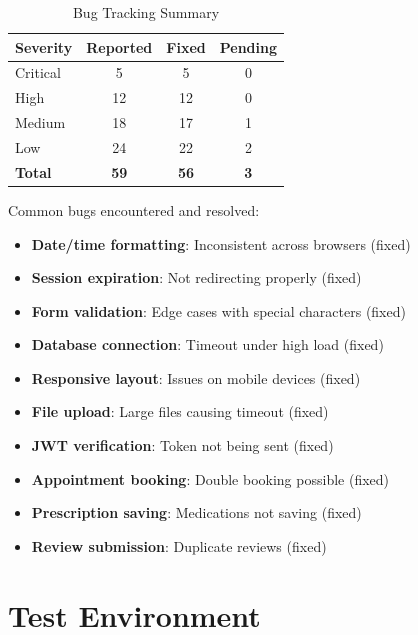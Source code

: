 \begin{table}[H]
    \centering
    \small
    \setlength{\tabcolsep}{3pt}
    \begin{tabular}{|l|c|c|c|}
        \hline
        \textbf{Severity} & \textbf{Reported} & \textbf{Fixed} & \textbf{Pending} \\
        \hline
        Critical & 5 & 5 & 0 \\
        \hline
        High & 12 & 12 & 0 \\
        \hline
        Medium & 18 & 17 & 1 \\
        \hline
        Low & 24 & 22 & 2 \\
        \hline
        \textbf{Total} & \textbf{59} & \textbf{56} & \textbf{3} \\
        \hline
    \end{tabular}
    \caption{Bug Tracking Summary}
    \label{tab:bugs}
\end{table}

Common bugs encountered and resolved:

\begin{itemize}
    \item \textbf{Date/time formatting}: Inconsistent across browsers (fixed)
    \item \textbf{Session expiration}: Not redirecting properly (fixed)
    \item \textbf{Form validation}: Edge cases with special characters (fixed)
    \item \textbf{Database connection}: Timeout under high load (fixed)
    \item \textbf{Responsive layout}: Issues on mobile devices (fixed)
    \item \textbf{File upload}: Large files causing timeout (fixed)
    \item \textbf{JWT verification}: Token not being sent (fixed)
    \item \textbf{Appointment booking}: Double booking possible (fixed)
    \item \textbf{Prescription saving}: Medications not saving (fixed)
    \item \textbf{Review submission}: Duplicate reviews (fixed)
\end{itemize}

\section{Test Environment}

